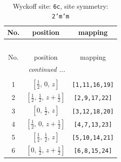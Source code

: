 \documentclass[fleqn,8pt]{jsarticle}
\begin{document}
\renewcommand{\arraystretch}{1.2}
\begin{longtable}{ccc}
\caption{Wyckoff site: {\tt 6c}, site symmetry: {\tt 2'm'm}}
 \\
 \hline \hline
No. & position & mapping \\ \hline \endfirsthead

\multicolumn{2}{l}{\tablename\ \thetable{}} \\
 \hline \hline
No. & position & mapping \\ \hline \endhead

 \hline \hline
\multicolumn{2}{r}{\footnotesize\it continued ...} \\ \endfoot

 \hline \hline
\multicolumn{2}{r}{} \\ \endlastfoot

1 & $\left[ \frac{1}{2},\, 0,\, z \right]$ & {\tt [1,11,16,19]} \\ \hline
2 & $\left[ \frac{1}{2},\, \frac{1}{2},\, z + \frac{1}{2} \right]$ & {\tt [2,9,17,22]} \\ \hline
3 & $\left[ 0,\, \frac{1}{2},\, z \right]$ & {\tt [3,12,18,20]} \\ \hline
4 & $\left[ \frac{1}{2},\, 0,\, z + \frac{1}{2} \right]$ & {\tt [4,7,13,23]} \\ \hline
5 & $\left[ \frac{1}{2},\, \frac{1}{2},\, z \right]$ & {\tt [5,10,14,21]} \\ \hline
6 & $\left[ 0,\, \frac{1}{2},\, z + \frac{1}{2} \right]$ & {\tt [6,8,15,24]} \\
\end{longtable}
\renewcommand{\arraystretch}{1.2}
\end{document}
